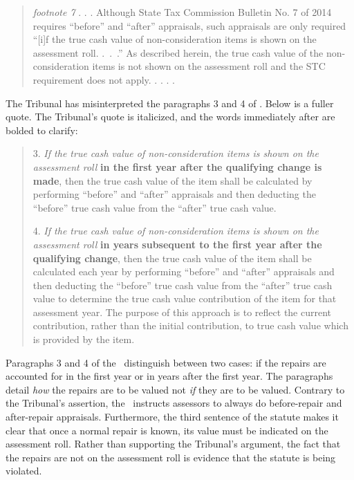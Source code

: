 \documentclass[12pt,\documentclassflag]{michiganCourtOfAppealsBrief}
\begin{document}
\begin{quote}
  {\em footnote 7} . . .  Although State Tax Commission Bulletin No. 7 of 2014 requires ``before'' and ``after'' appraisals, such appraisals are only required ``[i]f the true cash value of non-consideration items is shown on the assessment roll. .~.~.'' As described herein, the true cash value of the non-consideration items is not shown on the assessment roll and the STC requirement does not apply. . . . \reconsiderationDenied[2].
\end{quote}

The Tribunal has misinterpreted the paragraphs 3 and 4 of . Below is a fuller quote. The Tribunal's quote is italicized, and the words immediately after are bolded to clarify:

\begin{quotation}
3. {\em If the true cash value of non-consideration items is shown on the assessment roll} \textbf{in the first year after the qualifying change is made}, then the true cash value of the item shall be calculated by performing ``before'' and ``after'' appraisals and then deducting the ``before'' true cash value from the ``after'' true cash value.

4. {\em If the true cash value of non-consideration items is shown on the assessment roll} \textbf{in years subsequent to the first year after the qualifying change}, then the true cash value of the item shall be calculated each year by performing ``before'' and ``after'' appraisals and then deducting the ``before'' true cash value from the ``after'' true cash value to determine the true cash value contribution of the item for that assessment year. The purpose of this approach is to reflect the current contribution, rather than the initial contribution, to true cash value which is provided by the item.
\end{quotation}

Paragraphs 3 and 4 of the \cite[s]{STC Bulletin}\ distinguish between two cases: if the repairs are accounted for in the first year or in years after the first year. The paragraphs detail {\em how} the repairs are to be valued not {\em if} they are to be valued. Contrary to the Tribunal's assertion, the \cite[s]{STC Bulletin}\ instructs assessors to always do before-repair and after-repair appraisals. Furthermore, the third sentence of the statute makes it clear that once a normal repair is known, its value must be indicated on the assessment roll. Rather than supporting the Tribunal's argument, the fact that the repairs are not on the assessment roll is evidence that the statute is being violated. 
\end{document}
